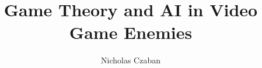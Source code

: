 \documentclass[10pt,palatino,code,picins,kaukecopyright,openright,woolshort,dropcaps,verbatim,index,euler]{woosterthesis}
\title{Game Theory and AI in Video Game Enemies}
\author{Nicholas Czaban}
\begin{document}
%
%

\frontmatter
\maketitle
\ClearShipoutPicture
\clearpage\thispagestyle{empty}\null\clearpage
\disscopyright 

%                                                                                       
%                                                                                       

\begin{abstract}

\end{abstract}

%                                                                                       
%                                                                                       

\dedication{}


%                                                                                       
%                                                                                       

\begin{acknowl}

\end{acknowl}

%                                                                                       
%                                                                                       
\end{document}
